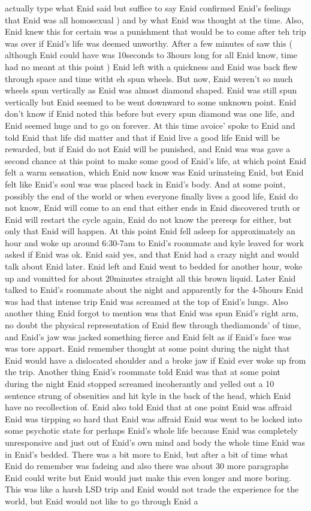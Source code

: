 \documentclass[12pt]{book}
\begin{document}
actually type what Enid said but suffice to say Enid confirmed Enid's feelings that Enid was all homosexual ) and by what Enid was thought at the time. Also, Enid knew this for certain was a punishment that would be to come after teh trip was over if Enid's life was deemed unworthy. After a few minutes of saw this ( although Enid could have was 10seconds to 3hours long for all Enid know, time had no meant at this point ) Enid left with a quickness and Enid was back flew through space and time witht eh spun wheels. But now, Enid weren't so much wheels spun vertically as Enid was almost diamond shaped. Enid was still spun vertically but Enid seemed to be went downward to some unknown point. Enid don't know if Enid noted this before but every spun diamond was one life, and Enid seemed huge and to go on forever. At this time avoice' spoke to Enid and told Enid that life did matter and that if Enid live a good life Enid will be rewarded, but if Enid do not Enid will be punished, and Enid was was gave a second chance at this point to make some good of Enid's life, at which point Enid felt a warm sensation, which Enid now know was Enid urinateing Enid, but Enid felt like Enid's soul was was placed back in Enid's body. And at some point, possibly the end of the world or when everyone finally lives a good life, Enid do not know, Enid will come to an end that either ends in Enid discovered truth or Enid will restart the cycle again, Enid do not know the prereqs for either, but only that Enid will happen. At this point Enid fell asleep for approximately an hour and woke up around 6:30-7am to Enid's roommate and kyle leaved for work asked if Enid was ok. Enid said yes, and that Enid had a crazy night and would talk about Enid later. Enid left and Enid went to bedded for another hour, woke up and vomitted for about 20minutes straight all this brown liquid. Later Enid talked to Enid's roommate about the night and apparently for the 4-5hours Enid was had that intense trip Enid was screamed at the top of Enid's lungs. Also another thing Enid forgot to mention was that Enid was spun Enid's right arm, no doubt the physical representation of Enid flew through thediamonds' of time, and Enid's jaw was jacked something fierce and Enid felt as if Enid's face was was tore appart. Enid remember thought at some point during the night that Enid would have a dislocated shoulder and a broke jaw if Enid ever woke up from the trip. Another thing Enid's roommate told Enid was that at some point during the night Enid stopped screamed incoherantly and yelled out a 10 sentence strung of obsenities and hit kyle in the back of the head, which Enid have no recollection of. Enid also told Enid that at one point Enid was affraid Enid was tirpping so hard that Enid was affraid Enid was went to be locked into some psychotic state for perhaps Enid's whole life because Enid was completely unresponsive and just out of Enid's own mind and body the whole time Enid was in Enid's bedded. There was a bit more to Enid, but after a bit of time what Enid do remember was fadeing and also there was about 30 more paragraphs Enid could write but Enid would just make this even longer and more boring. This was like a harsh LSD trip and Enid would not trade the experience for the world, but Enid would not like to go through Enid a 
\end{document}

